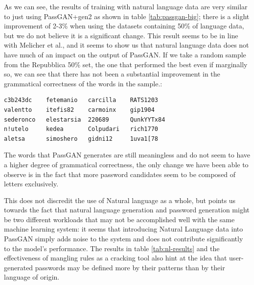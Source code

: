 As we can see, the results of training with natural language data are very similar to just using PassGAN+gen2 as shown in table \ref{tab:passgan-big}; there is a slight improvement of 2-3\% when using the datasets containing 50\% of language data, but we do not believe it is a significant change. This result seems to be in line with Melicher et al.\cite{Melicher2016}, and it seems to show us that natural language data does not have much of an impact on the output of PassGAN. 
If we take a random sample from the Repubblica 50\% set, the one that performed the best even if marginally so, we can see that there has not been a substantial improvement in the grammatical correctness of the words in the sample.:
\begin{verbatim}
c3b243dc    fetemanio   carcilla    RATS1203
valentto    itefis82    carmoinx    gip1904
sederonco   elestarsia  220689      QunkYYTx84
n!utelo     kedea       Colpudari   rich1770
aletsa      simoshero   gidni12     1uva1[78
\end{verbatim}    

The words that PassGAN generates are still meaningless and do not seem to have a higher degree of grammatical correctness, the only change we have been able to observe is in the fact that more password candidates seem to be composed of letters exclusively.

This does not discredit the use of Natural language as a whole, but points us towards the fact that natural language generation and password generation might be two different workloads that may not be accomplished well with the same machine learning system: it seems that introducing Natural Language data into PassGAN simply adds noise to the system and does not contribute significantly to the model's performance.
The results in table \ref{tab:nl-results} and the effectiveness of mangling rules as a cracking tool also hint at the idea that user-generated passwords may be defined more by their patterns than by their language of origin.

